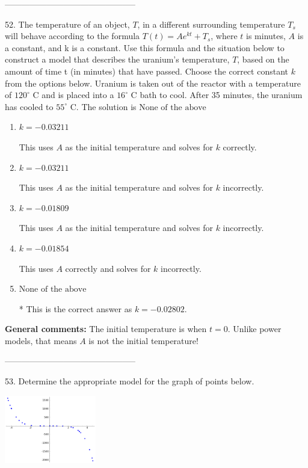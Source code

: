 \documentclass{extbook}[14pt]
\begin{document}
-----------------------------------------------

52. The temperature of an object, $T$, in a different surrounding temperature $T_s$ will behave according to the formula $T(t) = Ae^{kt} + T_s$, where $t$ is minutes, $A$ is a constant, and k is a constant. Use this formula and the situation below to construct a model that describes the uranium's temperature, $T$, based on the amount of time t (in minutes) that have passed. Choose the correct constant $k$ from the options below.
Uranium is taken out of the reactor with a temperature of $120^{\circ}$ C and is placed into a $16^{\circ}$ C bath to cool. After 35 minutes, the uranium has cooled to $55^{\circ}$ C. 
The solution is $ \text{None of the above} $ 

\begin{enumerate}[label=\Alph*.] 
\item $ k = -0.03211 $ 

 This uses $A$ as the initial temperature and solves for $k$ correctly. 
\item $ k = -0.03211 $ 

 This uses $A$ as the initial temperature and solves for $k$ incorrectly. 
\item $ k = -0.01809 $ 

 This uses $A$ as the initial temperature and solves for $k$ incorrectly. 
\item $ k = -0.01854 $ 

 This uses $A$ correctly and solves for $k$ incorrectly. 
\item $ \text{None of the above} $ 

 * This is the correct answer as $k = -0.02802$. 
\end{enumerate} 
 
\textbf{General comments:} The initial temperature is when $t = 0$. Unlike power models, that means $A$ is not the initial temperature!

-----------------------------------------------

53. Determine the appropriate model for the graph of points below.
\begin{center} \includegraphics[width=0.3\textwidth]{../Figures/identifyModelGraph11B.png} \end{center} 
\end{document}
